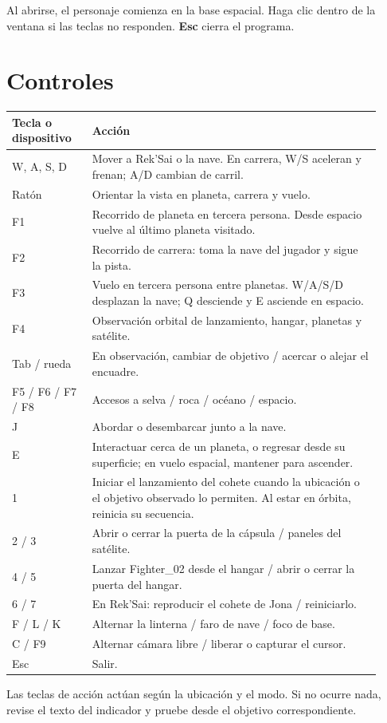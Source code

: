 \documentclass[11pt,letterpaper]{article}
\begin{document}
Al abrirse, el personaje comienza en la base espacial. Haga clic dentro de la ventana si las teclas no responden. \textbf{Esc} cierra el programa.

\section{Controles}
\small
\begin{longtable}{p{0.20\linewidth}p{0.72\linewidth}}
\toprule Tecla o dispositivo & Acción \\ \midrule\endhead
W, A, S, D & Mover a Rek'Sai o la nave. En carrera, W/S aceleran y frenan; A/D cambian de carril.\\
Ratón & Orientar la vista en planeta, carrera y vuelo.\\
F1 & Recorrido de planeta en tercera persona. Desde espacio vuelve al último planeta visitado.\\
F2 & Recorrido de carrera: toma la nave del jugador y sigue la pista.\\
F3 & Vuelo en tercera persona entre planetas. W/A/S/D desplazan la nave; Q desciende y E asciende en espacio.\\
F4 & Observación orbital de lanzamiento, hangar, planetas y satélite.\\
Tab / rueda & En observación, cambiar de objetivo / acercar o alejar el encuadre.\\
F5 / F6 / F7 / F8 & Accesos a selva / roca / océano / espacio.\\
J & Abordar o desembarcar junto a la nave.\\
E & Interactuar cerca de un planeta, o regresar desde su superficie; en vuelo espacial, mantener para ascender.\\
1 & Iniciar el lanzamiento del cohete cuando la ubicación o el objetivo observado lo permiten. Al estar en órbita, reinicia su secuencia.\\
2 / 3 & Abrir o cerrar la puerta de la cápsula / paneles del satélite.\\
4 / 5 & Lanzar Fighter\_02 desde el hangar / abrir o cerrar la puerta del hangar.\\
6 / 7 & En Rek'Sai: reproducir el cohete de Jona / reiniciarlo.\\
F / L / K & Alternar la linterna / faro de nave / foco de base.\\
C / F9 & Alternar cámara libre / liberar o capturar el cursor.\\
Esc & Salir.\\\bottomrule
\end{longtable}\normalsize
Las teclas de acción actúan según la ubicación y el modo. Si no ocurre nada, revise el texto del indicador y pruebe desde el objetivo correspondiente.
\end{document}
